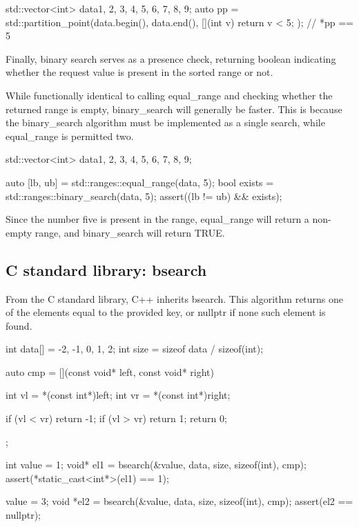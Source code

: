 \begin{box-note}
\begin{cppcode}
std::vector<int> data{1, 2, 3, 4, 5, 6, 7, 8, 9};
auto pp = std::partition_point(data.begin(), data.end(), 
                                [](int v) { return v < 5; });
// *pp == 5
\end{cppcode}
\end{box-note}

Finally, binary search serves as a presence check, returning boolean indicating whether the request value is present in the sorted range or not.



While functionally identical to calling equal\_range and checking whether the returned range is empty, binary\_search will generally be faster. This is because the binary\_search algorithm must be implemented as a single search, while equal\_range is permitted two.

\begin{box-note}
\begin{cppcode}
std::vector<int> data{1, 2, 3, 4, 5, 6, 7, 8, 9};

auto [lb, ub] = std::ranges::equal_range(data, 5);
bool exists = std::ranges::binary_search(data, 5);
assert((lb != ub) && exists);
\end{cppcode}
\end{box-note}

Since the number five is present in the range, equal\_range will return a non-empty range, and binary\_search will return TRUE.

\subsection{C standard library: bsearch}

From the C standard library, C++ inherits bsearch. This algorithm returns one of the elements equal to the provided key, or nullptr if none such element is found.

\begin{box-note}
\begin{cppcode}
int data[] = {-2, -1, 0, 1, 2};
int size = sizeof data / sizeof(int);

auto cmp = [](const void* left, const void* right){
    int vl = *(const int*)left;
    int vr = *(const int*)right;

    if (vl < vr) return -1;
    if (vl > vr) return 1;
    return 0;
};

int value = 1;
void* el1 = bsearch(&value, data, size, sizeof(int), cmp);
assert(*static_cast<int*>(el1) == 1);

value = 3;
void *el2 = bsearch(&value, data, size, sizeof(int), cmp); 
assert(el2 == nullptr);
\end{cppcode}
\end{box-note}

